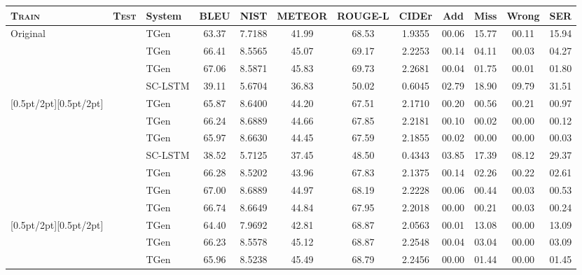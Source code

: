 \documentclass[11pt,a4paper]{article}
\newcommand\Tstrut{\rule{0pt}{2.3ex}}       \newcommand\Bstrut{\rule[-1.5ex]{0pt}{0pt}}
\begin{document}
\begin{table*}[tb]
\footnotesize\centering
\begin{tabular}{lcl|ccccc|cccc}\hline
\bf \textsc{Train}          & \bf \textsc{Test}              
        & \bf System              & \bf BLEU & \bf NIST & \bf \hspace{-2mm}METEOR\hspace{-2mm} & \bf \hspace{-1mm}ROUGE-L\hspace{-3mm} & \bf CIDEr & \bf Add & \bf Miss & \bf Wrong &\bf SER\Tstrut \\\hline
\multirow{4}{*}{Original} & \parbox[t]{2mm}{} 
        & TGen  & 63.37 & 7.7188 & 41.99 & 68.53 & 1.9355 & 00.06 & 15.77 & 00.11 & 15.94\Tstrut  \\ &   & TGen     & 66.41 & 8.5565 & 45.07 & 69.17 & 2.2253 & 00.14 & 04.11 & 00.03 & 04.27  \\ &   & TGen  & 67.06 & 8.5871 & 45.83 & 69.73 & 2.2681 & 00.04 & 01.75 & 00.01 & 01.80  \\ &   & SC-LSTM  & 39.11 & 5.6704 & 36.83 & 50.02 & 0.6045 & 02.79 & 18.90 & 09.79 & 31.51 \\[0.5pt/2pt][0.5pt/2pt]
  & & TGen  & 65.87 & 8.6400 & 44.20 & 67.51 & 2.1710 & 00.20 & 00.56 & 00.21 & 00.97\Tstrut  \\ &   & TGen     & 66.24 & 8.6889 & 44.66 & 67.85 & 2.2181 & 00.10 & 00.02 & 00.00  & 00.12  \\ &   & TGen  & 65.97 & 8.6630 & 44.45 & 67.59 & 2.1855 & 00.02 & 00.00 & 00.00 & 00.03  \\ &   & SC-LSTM  & 38.52 & 5.7125 & 37.45 & 48.50 & 0.4343 & 03.85 & 17.39 & 08.12 & 29.37 \\
 & & TGen  & 66.28 & 8.5202 & 43.96 & 67.83 & 2.1375 & 00.14 & 02.26 & 00.22 & 02.61\Tstrut  \\ &   & TGen     & 67.00 & 8.6889 & 44.97 & 68.19 & 2.2228 & 00.06 & 00.44 & 00.03 & 00.53  \\ &   & TGen  & 66.74 & 8.6649 & 44.84 & 67.95 & 2.2018 & 00.00 & 00.21 & 00.03 & 00.24 \\[0.5pt/2pt][0.5pt/2pt]   & & TGen  & 64.40 & 7.9692 & 42.81 & 68.87 & 2.0563 & 00.01 & 13.08 & 00.00 & 13.09\Tstrut  \\ &   & TGen     & 66.23 & 8.5578 & 45.12 & 68.87 & 2.2548 & 00.04 & 03.04 & 00.00 & 03.09  \\ &   & TGen  & 65.96 & 8.5238 & 45.49 & 68.79 & 2.2456 & 00.00 & 01.44 & 00.00 & 01.45  \\\hline \end{tabular}

\end{table*}
\end{document}

